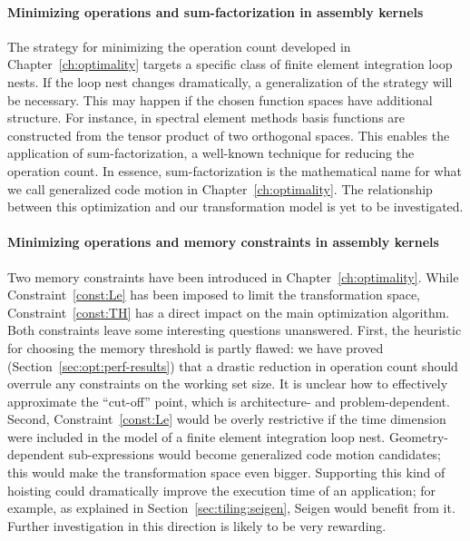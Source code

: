 \paragraph{Minimizing operations and sum-factorization in assembly kernels}
The strategy for minimizing the operation count developed in Chapter~\ref{ch:optimality} targets a specific class of finite element integration loop nests. If the loop nest changes dramatically, a generalization of the strategy will be necessary. This may happen if the chosen function spaces have additional structure. For instance, in spectral element methods basis functions are constructed from the tensor product of two orthogonal spaces. This enables the application of sum-factorization, a well-known technique for reducing the operation count. In essence, sum-factorization is the mathematical name for what we call generalized code motion in Chapter~\ref{ch:optimality}. The relationship between this optimization and our transformation model is yet to be investigated.

\paragraph{Minimizing operations and memory constraints in assembly kernels}
Two memory constraints have been introduced in Chapter~\ref{ch:optimality}. While Constraint~\ref{const:Le} has been imposed to limit the transformation space, Constraint~\ref{const:TH} has a direct impact on the main optimization algorithm. Both constraints leave some interesting questions unanswered. First, the heuristic for choosing the memory threshold is partly flawed: we have proved (Section~\ref{sec:opt:perf-results}) that a drastic reduction in operation count should overrule any constraints on the working set size. It is unclear how to effectively approximate the ``cut-off'' point, which is architecture- and problem-dependent. Second, Constraint~\ref{const:Le} would be overly restrictive if the time dimension were included in the model of a finite element integration loop nest. Geometry-dependent sub-expressions would become generalized code motion candidates; this would make the transformation space even bigger. Supporting this kind of hoisting could dramatically improve the execution time of an application; for example, as explained in Section~\ref{sec:tiling:seigen}, Seigen would benefit from it. Further investigation in this direction is likely to be very rewarding.

